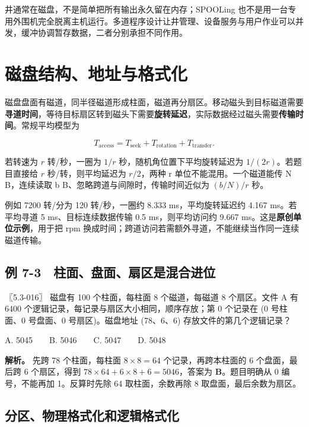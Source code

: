 井通常在磁盘，不是简单把所有输出永久留在内存；SPOOLing 也不是用一台专用外围机完全脱离主机运行。多道程序设计让井管理、设备服务与用户作业可以并发，缓冲协调暂存数据，二者分别承担不同作用。

\section{磁盘结构、地址与格式化}\label{os-7-8}

磁盘盘面有磁道，同半径磁道形成柱面，磁道再分扇区。移动磁头到目标磁道需要\textbf{寻道时间}，等待目标扇区转到磁头下需要\textbf{旋转延迟}，实际数据经过磁头需要\textbf{传输时间}。常规平均模型为

\[T_{\mathrm{access}}=T_{\mathrm{seek}}+T_{\mathrm{rotation}}+T_{\mathrm{transfer}}.\]

若转速为 \(r\) 转/秒，一圈为 \(1/r\) 秒，随机角位置下平均旋转延迟为 \(1/(2r)\)。若题目直接给 \(r\) 秒/转，则平均延迟为 \(r/2\)，两种 r 单位不能混用。一个磁道能传 N B，连续读取 b B、忽略跨道与间隙时，传输时间近似为 \((b/N)/r\) 秒。

例如 7200 转/分为 120 转/秒，一圈约 8.333 ms，平均旋转延迟约 4.167 ms。若平均寻道 5 ms、目标连续数据传输 0.5 ms，则平均访问约 9.667 ms。这是\textbf{原创单位示例}，用于把 rpm 换成时间；跨道访问若需额外寻道，不能继续当作同一连续磁道传输。

\subsection{例 7-3　柱面、盘面、扇区是混合进位}\label{os-ex7-3}

\noindent{}〖5.3-016〗 磁盘有 100 个柱面，每柱面 8 个磁道，每磁道 8 个扇区。文件 A 有 6400 个逻辑记录，每记录与扇区大小相同，顺序存放；第 0 个记录在 (0 号柱面、0 号盘面、0 号扇区)。磁盘地址 (78、6、6) 存放文件的第几个逻辑记录？

A. 5045　　B. 5046　　C. 5047　　D. 5048


\textbf{解析。} 先跨 78 个柱面，每柱面 \(8\times8=64\) 个记录，再跨本柱面的 6 个盘面，最后跨 6 个扇区，得到 \(78\times64+6\times8+6=5046\)，答案为 \textbf{B}。题目明确从 0 编号，不能再加 1。反算时先除 64 取柱面，余数再除 8 取盘面，最后余数为扇区。

\subsection{分区、物理格式化和逻辑格式化}\label{os-c07-h127}

